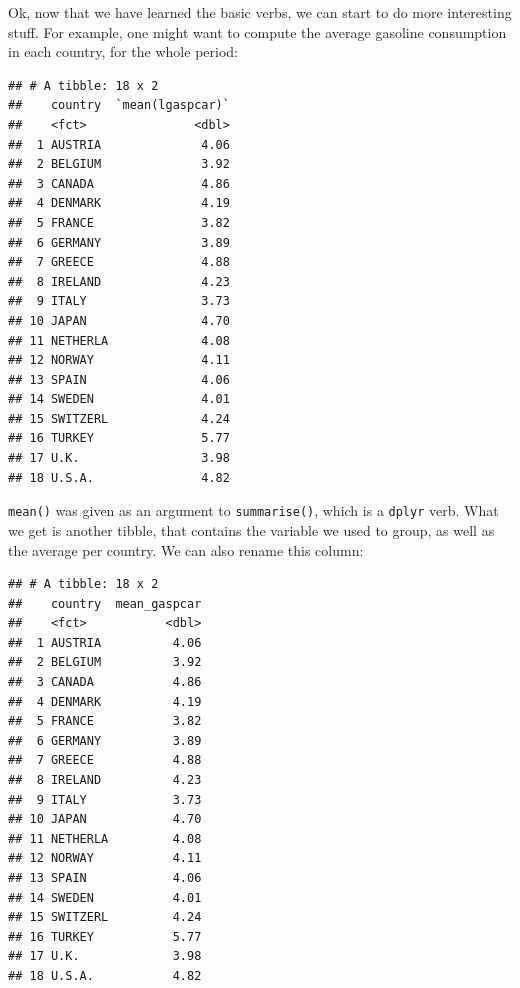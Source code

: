 \documentclass[]{gitbook}
\newenvironment{Shaded}{\begin{snugshade}}{\end{snugshade}}
\newcommand{\DataTypeTok}[1]{\textcolor[rgb]{0.13,0.29,0.53}{#1}}
\newcommand{\KeywordTok}[1]{\textcolor[rgb]{0.13,0.29,0.53}{\textbf{#1}}}
\newcommand{\NormalTok}[1]{#1}
\newcommand{\OperatorTok}[1]{\textcolor[rgb]{0.81,0.36,0.00}{\textbf{#1}}}
\newcommand{\StringTok}[1]{\textcolor[rgb]{0.31,0.60,0.02}{#1}}
\begin{document}
Ok, now that we have learned the basic verbs, we can start to do more interesting stuff. For
example, one might want to compute the average gasoline consumption in each country, for
the whole period:

\begin{Shaded}
\end{Shaded}

\begin{verbatim}
## # A tibble: 18 x 2
##    country  `mean(lgaspcar)`
##    <fct>               <dbl>
##  1 AUSTRIA              4.06
##  2 BELGIUM              3.92
##  3 CANADA               4.86
##  4 DENMARK              4.19
##  5 FRANCE               3.82
##  6 GERMANY              3.89
##  7 GREECE               4.88
##  8 IRELAND              4.23
##  9 ITALY                3.73
## 10 JAPAN                4.70
## 11 NETHERLA             4.08
## 12 NORWAY               4.11
## 13 SPAIN                4.06
## 14 SWEDEN               4.01
## 15 SWITZERL             4.24
## 16 TURKEY               5.77
## 17 U.K.                 3.98
## 18 U.S.A.               4.82
\end{verbatim}

\texttt{mean()} was given as an argument to \texttt{summarise()}, which is a \texttt{dplyr} verb. What we get is another
tibble, that contains the variable we used to group, as well as the average per country. We can
also rename this column:

\begin{Shaded}
\end{Shaded}

\begin{verbatim}
## # A tibble: 18 x 2
##    country  mean_gaspcar
##    <fct>           <dbl>
##  1 AUSTRIA          4.06
##  2 BELGIUM          3.92
##  3 CANADA           4.86
##  4 DENMARK          4.19
##  5 FRANCE           3.82
##  6 GERMANY          3.89
##  7 GREECE           4.88
##  8 IRELAND          4.23
##  9 ITALY            3.73
## 10 JAPAN            4.70
## 11 NETHERLA         4.08
## 12 NORWAY           4.11
## 13 SPAIN            4.06
## 14 SWEDEN           4.01
## 15 SWITZERL         4.24
## 16 TURKEY           5.77
## 17 U.K.             3.98
## 18 U.S.A.           4.82
\end{verbatim}
\end{document}
